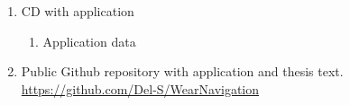 \label{sec:Attachments}
\begin{enumerate}
	\item CD with application
	\begin{enumerate}
		\item Application data
	\end{enumerate}
	\item Public Github repository with application and thesis text.
	\\ \url{https://github.com/Del-S/WearNavigation}
\end{enumerate}